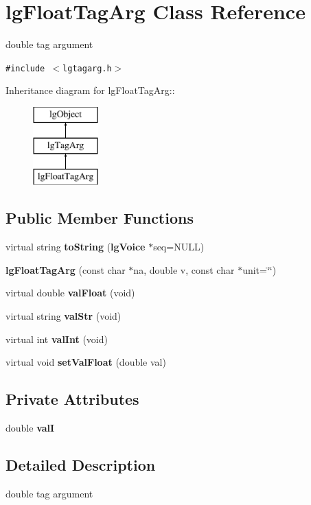 \section{lg\-Float\-Tag\-Arg Class Reference}
\label{classlgFloatTagArg}
double tag argument  


{\tt \#include $<$lgtagarg.h$>$}

Inheritance diagram for lg\-Float\-Tag\-Arg::\begin{figure}[H]
\begin{center}
\leavevmode
\includegraphics[height=3cm]{classlgFloatTagArg}
\end{center}
\end{figure}
\subsection*{Public Member Functions}
\begin{CompactItemize}
\item 
virtual string {\bf to\-String} ({\bf lg\-Voice} $\ast$seq=NULL)
\item 
{\bf lg\-Float\-Tag\-Arg} (const char $\ast$na, double v, const char $\ast$unit=\char`\"{}\char`\"{})
\item 
virtual double {\bf val\-Float} (void)
\item 
virtual string {\bf val\-Str} (void)
\item 
virtual int {\bf val\-Int} (void)
\item 
virtual void {\bf set\-Val\-Float} (double val)
\end{CompactItemize}
\subsection*{Private Attributes}
\begin{CompactItemize}
\item 
double {\bf val\-I}
\end{CompactItemize}


\subsection{Detailed Description}
double tag argument 



